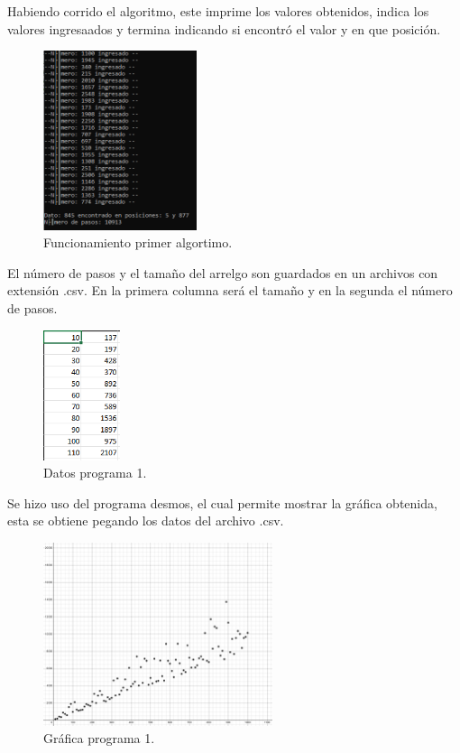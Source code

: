 \documentclass{report}
\begin{document}
	\large Habiendo corrido el algoritmo, este imprime los valores obtenidos, indica los valores ingresaados y termina indicando si encontró el valor y en que posición. \par
	\begin{figure}[h]
		\centering
		\includegraphics[width=0.4\textwidth]{2} \par
		\caption{Funcionamiento primer algortimo.}
	\end{figure}
	
	\newpage
	
	\large El número de pasos y el tamaño del arrelgo son guardados en un archivos con extensión .csv. En la primera columna será el tamaño y en la segunda el número de pasos.\par
	\begin{figure}[h]
		\centering
		\includegraphics[width=0.2\textwidth]{3} \par
		\caption{Datos programa 1.}
	\end{figure}

	\large Se hizo uso del programa desmos, el cual permite mostrar la gráfica obtenida, esta se obtiene pegando los datos del archivo .csv.\par
	\begin{figure}[h]
		\centering
		\includegraphics[width=0.6\textwidth]{4} \par
		\caption{Gráfica programa 1.}
	\end{figure}
\end{document}
